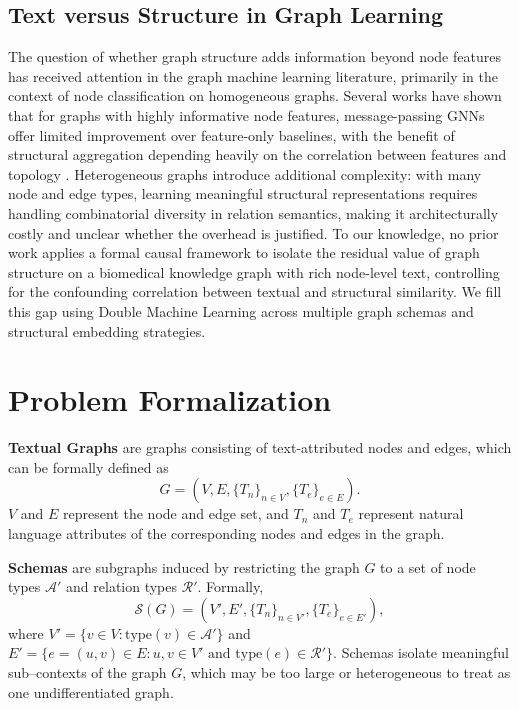 \documentclass{article}
\theoremstyle{plain}
\theoremstyle{definition}
\theoremstyle{remark}
\begin{document}
\subsection{Text versus Structure in Graph Learning}

The question of whether graph structure adds information beyond node features has received attention in the graph machine learning literature, primarily in the context of node classification on homogeneous graphs. Several works have shown that for graphs with highly informative node features, message-passing GNNs offer limited improvement over feature-only baselines, with the benefit of structural aggregation depending heavily on the correlation between features and topology \citep{huang2023}. Heterogeneous graphs introduce additional complexity: with many node and edge types, learning meaningful structural representations requires handling combinatorial diversity in relation semantics, making it architecturally costly and unclear whether the overhead is justified. To our knowledge, no prior work applies a formal causal framework to isolate the residual value of graph structure on a biomedical knowledge graph with rich node-level text, controlling for the confounding correlation between textual and structural similarity. We fill this gap using Double Machine Learning \citep{dml2018} across multiple graph schemas and structural embedding strategies.

\section{Problem Formalization}

\textbf{Textual Graphs} are graphs consisting of text-attributed nodes and edges, which can be formally defined as $$G = (V, E, \{T_n\}_{n \in V}, \{T_e\}_{e\in E}).$$ $V$ and $E$ represent the node and edge set, and $T_n$ and $T_e$ represent natural language attributes of the corresponding nodes and edges in the graph. 

\textbf{Schemas} are subgraphs induced by restricting the graph $G$ to a set of node types $\mathcal{A}'$ and relation types $\mathcal{R}'$. Formally, 
$$
\mathcal{S}(G) = (V', E', \{T_n\}_{n \in V'}, \{T_e\}_{e \in E'}),
$$
where $V' = \{v \in V : \mathrm{type}(v) \in \mathcal{A}'\}$ and $E' = \{e=(u,v) \in E : u,v \in V' \text{ and } \mathrm{type}(e) \in \mathcal{R}'\}.$ Schemas isolate meaningful sub--contexts of the graph $G$, which may be too large or heterogeneous to treat as one undifferentiated graph. 
\end{document}
